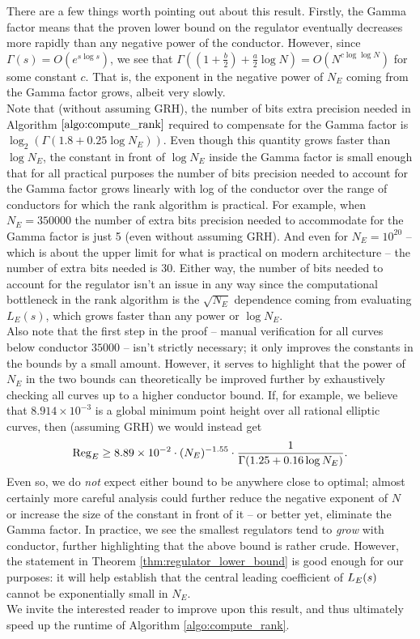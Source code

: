 There are a few things worth pointing out about this result. Firstly, the Gamma factor means that the proven lower bound on the regulator eventually decreases more rapidly than any negative power of the conductor. However, since $\Gamma(s) = O(e^{s\log s})$, we see that $\Gamma\left((1+\frac{b}{2})+\frac{a}{2} \log N \right) = O(N^{c\log\log N})$ for some constant $c$. That is, the exponent in the negative power of $N_E$ coming from the Gamma factor grows, albeit very slowly. \\

Note that (without assuming GRH), the number of bits extra precision needed in Algorithm $\ref{algo:compute_rank}$ required to compensate for the Gamma factor is $\log_2(\Gamma(1.8+0.25\log N_E))$. Even though this quantity grows faster than $\log N_E$, the constant in front of $\log N_E$ inside the Gamma factor is small enough that for all practical purposes the number of bits precision needed to account for the Gamma factor grows linearly with log of the conductor over the range of conductors for which the rank algorithm is practical. For example, when $N_E=350000$ the number of extra bits precision needed to accommodate for the Gamma factor is just 5 (even without assuming GRH). And even for $N_E = 10^{20}$ -- which is about the upper limit for what is practical on modern architecture -- the number of extra bits needed is 30. Either way, the number of bits needed to account for the regulator isn't an issue in any way since the computational bottleneck in the rank algorithm is the $\sqrt{N_E}$ dependence coming from evaluating $L_E(s)$, which grows faster than any power or $\log N_E$. \\

Also note that the first step in the proof -- manual verification for all curves below conductor $35000$ --  isn't strictly necessary; it only improves the constants in the bounds by a small amount. However, it serves to highlight that the power of $N_E$ in the two bounds can theoretically be improved further by exhaustively checking all curves up to a higher conductor bound. If, for example, we believe that $8.914\times 10^{-3}$ is a global minimum point height over all rational elliptic curves, then (assuming GRH) we would instead get
\begin{equation}
\operatorname{Reg}_E \ge 8.89 \times 10^{-2} \cdot (N_E)^{-1.55} \cdot \frac{1}{\Gamma(1.25+0.16 \log N_E)}.
\end{equation}
Even so, we do {\it not} expect either bound to be anywhere close to optimal; almost certainly more careful analysis could further reduce the negative exponent of $N$ or increase the size of the constant in front of it -- or better yet, eliminate the Gamma factor. In practice, we see the smallest regulators tend to {\it grow} with conductor, further highlighting that the above bound is rather crude. However, the statement in Theorem \ref{thm:regulator_lower_bound} is good enough for our purposes: it will help establish that the central leading coefficient of $L_E(s)$ cannot be exponentially small in $N_E$. \\

We invite the interested reader to improve upon this result, and thus ultimately speed up the runtime of Algorithm \ref{algo:compute_rank}. 